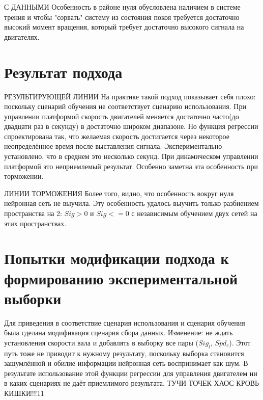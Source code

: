 \documentclass[14pt]{extreport}
\begin{document}
                { С ДАННЫМИ}
                Особенность в районе нуля обусловлена наличием в системе трения и чтобы "сорвать" систему из состояния покоя требуется достаточно высокий момент вращения, который требует достаточно высокого сигнала на двигателях.
            \section{Результат подхода}

                { РЕЗУЛЬТИРУЮЩЕЙ ЛИНИИ}
                На практике такой подход показывает себя плохо: поскольку сценарий обучения не соответствует сценарию использования. При управлении платформой скорость двигателей меняется достаточно часто(до двадцати раз в секунду) в достаточно широком диапазоне. Но функция регрессии спроектирована так, что желаемая скорость достигается через некоторое неопределённое время после выставления сигнала. Экспериментально установлено, что в среднем это несколько секунд. При динамическом управлении платформой это неприемлемый результат. Особенно заметна эта особенность при торможении.

                { ЛИНИИ ТОРМОЖЕНИЯ}
                Более того, видно, что особенность вокруг нуля нейронная сеть не выучила. Эту особенность удалось выучить только разбиением пространства на 2: $Sig>0$ и $Sig<=0$ с независимым обучением двух сетей на этих пространствах.
            \section{Попытки модификации подхода к формированию экспериментальной выборки}
                Для приведения в соответствие сценария использования и сценария обучения была сделана модификация сценария сбора данных. Изменение: не ждать установления скорости вала и добавлять в выборку все пары ($Sig_l$, $Spd_c$). Этот путь тоже не приводит к нужному результату, поскольку выборка становится зашумлённой и обилие информации нейронная сеть воспринимает как шум. В результате использование этой функции регрессии для управления двигателем ни в каких сценариях не даёт приемлимого результата.
                { ТУЧИ ТОЧЕК ХАОС КРОВЬ КИШКИ!!!11}
\end{document}

